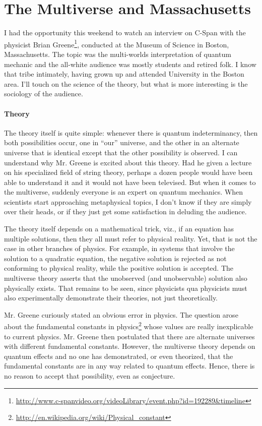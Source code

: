 \section{The Multiverse and Massachusetts}

I had the opportunity this weekend to watch an interview on C-Span with the physicist Brian Greene\footnote{\url{http://www.c-spanvideo.org/videoLibrary/event.php?id=192289\&timeline}}, conducted at the Museum of Science in Boston, Massachusetts. The topic was the multi-worlds interpretation of quantum mechanic and the all-white audience was mostly students and retired folk. I know that tribe intimately, having grown up and attended University in the Boston area. I'll touch on the science of the theory, but what is more interesting is the sociology of the audience.

\paragraph{Theory}


The theory itself is quite simple: whenever there is quantum indeterminancy, then both possibilities occur, one in ``our'' universe, and the other in an alternate universe that is identical except that the other possibility is observed. I can understand why Mr. Greene is excited about this theory. Had he given a lecture on his specialized field of string theory, perhaps a dozen people would have been able to understand it and it would not have been televised. But when it comes to the multiverse, suddenly everyone is an expert on quantum mechanics. When scientists start approaching metaphysical topics, I don't know if they are simply over their heads, or if they just get some satisfaction in deluding the audience.

The theory itself depends on a mathematical trick, viz., if an equation has multiple solutions, then they all must refer to physical reality. Yet, that is not the case in other branches of physics. For example, in systems that involve the solution to a quadratic equation, the negative solution is rejected as not conforming to physical reality, while the positive solution is accepted. The multiverse theory asserts that the unobserved (and unobservable) solution also physically exists. That remains to be seen, since physicists qua physicists must also experimentally demonstrate their theories, not just theoretically.

Mr. Greene curiously stated an obvious error in physics. The question arose about the fundamental constants in physics\footnote{\url{http://en.wikipedia.org/wiki/Physical_constant}} whose values are really inexplicable to current physics. Mr. Greene then postulated that there are alternate universes with different fundamental constants. However, the multiverse theory depends on quantum effects and no one has demonstrated, or even theorized, that the fundamental constants are in any way related to quantum effects. Hence, there is no reason to accept that possibility, even as conjecture.

